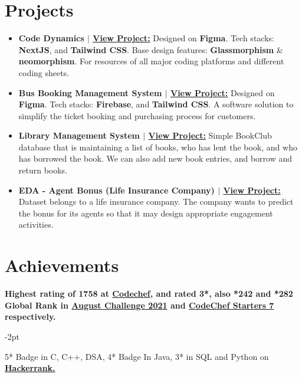 \documentclass[letterpaper,11pt]{article}
\newcommand{\resumeItem}[2]{
  \item\small{
    \textbf{#1}{ #2 \vspace{-2pt}}
  }
}
\newcommand{\resumeSubItem}[2]{\resumeItem{#1}{#2}\vspace{-4pt}}
\newcommand{\resumeSubHeadingListStart}{\begin{itemize}[leftmargin=*]}
\newcommand{\resumeSubHeadingListEnd}{\end{itemize}}
\newcommand{\resumeItemListStart}{\begin{itemize}}
\newcommand{\resumeItemListEnd}{\end{itemize}\vspace{-5pt}}
\begin{document}
\section{Projects}
  \resumeSubHeadingListStart
    \resumeSubItem{\textbf{Code Dynamics} $|$ {\href{https://www.codedynamics.in/}{\bf View Project:}}}
      {Designed on \textbf{Figma}. Tech stacks: \textbf{NextJS}, and \textbf{Tailwind CSS}. Base design features: \textbf{Glassmorphism} & \textbf{neomorphism}. For resources of all major coding platforms and different coding sheets.}
    \resumeSubItem{\textbf{Bus Booking Management System} $|$ {\href{https://github.com/AnkitRajCode/Bus-Booking-Management-System}{\bf View Project:}}}
      {Designed on \textbf{Figma}. Tech stacks: \textbf{Firebase}, and \textbf{Tailwind CSS}. A software solution to simplify the ticket booking and purchasing process for customers.}
    \resumeSubItem{\textbf{Library Management System} $|$ {\href{https://satyajeetramnit.github.io/Library-Management-System/}{\bf View Project:}}}
      {Simple BookClub database that is maintaining a list of books, who has lent the book, and who has borrowed the book. We can also add new book entries, and borrow and return books.}
    \resumeSubItem{\textbf{EDA - Agent Bonus (Life Insurance Company)} $|$ {\href{https://github.com/satyajeetramnit/Data-Science-Projects/tree/main/Agent-Bonus-Life-Insurance_Company}{\bf View Project:}}}
      {Dataset belongs to a life insurance company. The company wants to predict the bonus for its agents so that it may design appropriate engagement activities.}
  \resumeSubHeadingListEnd


\section{Achievements}
 \resumeSubHeadingListStart
    	\resumeItem{Highest rating of \textbf{1758} at {\href{https://codechef.com/users/ramnit_code_27}{\bf Codechef}, and rated \textbf{3*}, also *242 and \textbf{*282} Global Rank in \href{https://www.codechef.com/AUG21C}{August Challenge 2021} and \href{https://www.codechef.com/START7C}{CodeChef Starters 7} respectively.}}
    	
    	\resumeItem{5* Badge in C, C++, DSA, 4* Badge In Java, 3* in SQL and Python on  {\href{https://www.hackerrank.com/satyajeetramnit1?hr_r=1}{\bf Hackerrank.}}}
 \resumeSubHeadingListEnd
 
\end{document}
